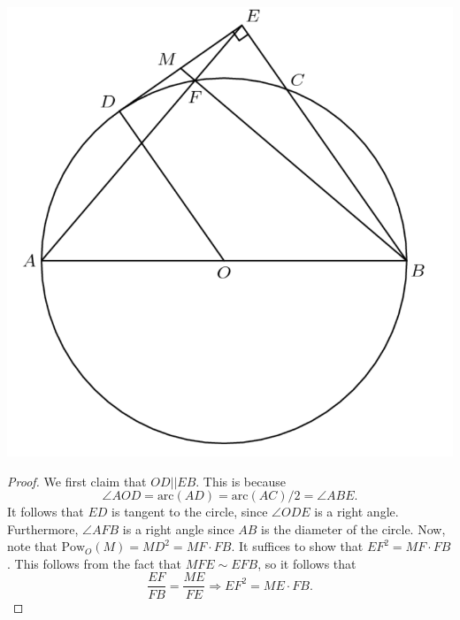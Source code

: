 \documentclass[12pt]{scrartcl}
\newcommand{\<}{\langle}
\renewcommand{\>}{\rangle}
\begin{document}
\begin{center}
\includegraphics[scale=0.6]{graphics/PoPp1.png}
\end{center}
\begin{proof}
We first claim that $OD || EB$.  This is because $$\angle AOD = \text{arc}(AD) = \text{arc}(AC)/2 = \angle ABE.$$
It follows that $ED$ is tangent to the circle, since $\angle ODE$ is a right angle.  Furthermore, $\angle AFB$ is a right angle since $AB$ is the diameter of the circle.  Now, note that $\text{Pow}_O(M) = MD^2 = MF \cdot FB.$  It suffices to show that $EF^2 = MF \cdot FB$.  This follows from the fact that $MFE \sim EFB$, so it follows that 
$$\dfrac{EF}{FB} = \dfrac{ME}{FE} \Longrightarrow EF^2 = ME \cdot FB.$$
\end{proof}
\end{document}
